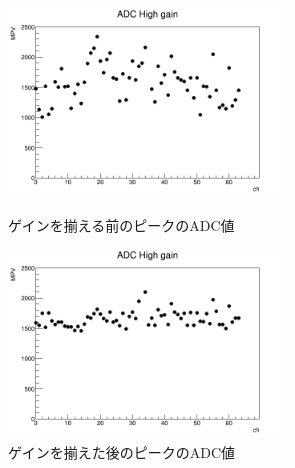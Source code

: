 \begin{figure}[H]
    \begin{minipage}[b]{0.47\linewidth}
        \centering
        \includegraphics[height=5cm]{img/gain_before.jpg}
        \caption{ゲインを揃える前のピークのADC値}
    \end{minipage}
    \begin{minipage}[b]{0.47\linewidth}
        \centering
        \includegraphics[height=5cm]{img/gain_after.jpg}
        \caption{ゲインを揃えた後のピークのADC値}
    \end{minipage}
\end{figure}